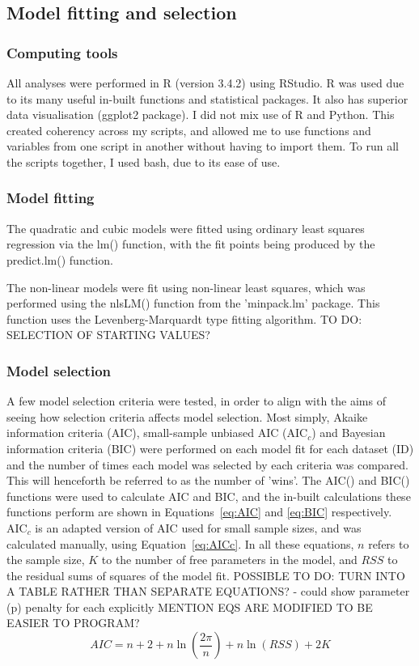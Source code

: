 \documentclass[11pt]{article}
\begin{document}
	\subsection{Model fitting and selection}
	\subsubsection*{Computing tools}
	All analyses were performed in R (version 3.4.2) using RStudio. R was used due to its many useful in-built functions and statistical packages. It also has superior data visualisation (ggplot2 package). I did not mix use of R and Python. This created coherency across my scripts, and allowed me to use functions and variables from one script in another without having to import them. To run all the scripts together, I used bash, due to its ease of use.
	
	\subsubsection*{Model fitting}
	The quadratic and cubic models were fitted using ordinary least squares regression via the lm() function, with the fit points being produced by the predict.lm() function.
	
	The non-linear models were fit using non-linear least squares, which was performed using the nlsLM() function from the 'minpack.lm' package. This function uses the Levenberg-Marquardt type fitting algorithm. TO DO: SELECTION OF STARTING VALUES?
	
	\subsubsection*{Model selection}
	A few model selection criteria were tested, in order to align with the aims of seeing how selection criteria affects model selection. Most simply, Akaike information criteria (AIC), small-sample unbiased AIC (AIC$_c$) and Bayesian information criteria (BIC) were performed on each model fit for each dataset (ID) and the number of times each model was selected by each criteria was compared. This will henceforth be referred to as the number of 'wins'. The AIC() and BIC() functions were used to calculate AIC and BIC, and the in-built calculations these functions perform are shown in Equations~\ref{eq:AIC} and \ref{eq:BIC} respectively. AIC$_c$ is an adapted version of AIC used for small sample sizes, and was calculated manually, using Equation~\ref{eq:AICc}. In all these equations, $n$ refers to the sample size, $K$ to the number of free parameters in the model, and $RSS$ to the residual sums of squares of the model fit. 
	POSSIBLE TO DO: TURN INTO A TABLE RATHER THAN SEPARATE EQUATIONS? - could show parameter (p) penalty for each explicitly
MENTION EQS ARE MODIFIED TO BE EASIER TO PROGRAM?
	\begin{equation} \label{eq:AIC}
	AIC = n + 2 + n\ln
		\left(
			\frac{2\pi}{n}								\right) 
	+ n\ln(RSS) + 2K
	\end{equation}
	
\end{document}
